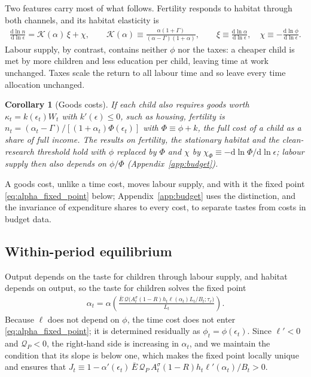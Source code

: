 \documentclass[11pt]{article}
\newtheorem{corollary}{Corollary}
\begin{document}
Two features carry most of what follows. Fertility responds to habitat through both channels, and its
habitat elasticity is
\begin{align}
\frac{\mathrm{d}\ln n}{\mathrm{d}\ln\epsilon}=\mathcal{K}(\alpha)\,\xi+\chi,
\qquad
\mathcal{K}(\alpha)\equiv\frac{\alpha(1+\Gamma)}{(\alpha-\Gamma)(1+\alpha)},
\qquad
\xi\equiv\frac{\mathrm{d}\ln\alpha}{\mathrm{d}\ln\epsilon},\quad
\chi\equiv-\frac{\mathrm{d}\ln\phi}{\mathrm{d}\ln\epsilon}.
\label{eq:S_def}
\end{align}
Labour supply, by contrast, contains neither $\phi$ nor the taxes: a cheaper child is met by more
children and less education per child, leaving time at work unchanged. Taxes scale the return to all
labour time and so leave every time allocation unchanged.

\begin{corollary}[Goods costs]
\label{cor:goods}
If each child also requires goods worth $\kappa_t=k(\epsilon_t)W_t$ with $k'(\epsilon)\le0$, such as
housing, fertility is $n_t=(\alpha_t-\Gamma)/[(1+\alpha_t)\Phi(\epsilon_t)]$ with
$\Phi\equiv\phi+k$, the full cost of a child as a share of full income. The results on fertility, the
stationary habitat and the clean-research threshold hold with $\phi$ replaced by $\Phi$ and $\chi$ by
$\chi_\Phi\equiv-\mathrm{d}\ln\Phi/\mathrm{d}\ln\epsilon$; labour supply then also depends on $\phi/\Phi$
(Appendix~\ref{app:budget}).
\end{corollary}

A goods cost, unlike a time cost, moves labour supply, and with it the fixed point
\eqref{eq:alpha_fixed_point} below; Appendix~\ref{app:budget} uses the distinction,
and the invariance of expenditure shares to every cost, to separate tastes from costs in budget data.

\subsection{Within-period equilibrium}
Output depends on the taste for children through labour supply, and habitat depends on output, so the
taste for children solves the fixed point
\begin{align}
\alpha_t=\alpha\!\left(\frac{\bar E\,\mathcal{Q}\big(A_t^{\sigma}(1-R)h_t\ell(\alpha_t)L_t/B_t;\tau_r\big)}{L_t}\right).
\label{eq:alpha_fixed_point}
\end{align}
Because $\ell$ does not depend on $\phi$, the time cost does not enter \eqref{eq:alpha_fixed_point}; it is
determined residually as $\phi_t=\phi(\epsilon_t)$. Since $\ell'<0$ and $\mathcal{Q}_P<0$, the right-hand
side is increasing in $\alpha_t$, and we maintain the condition that its slope is below one, which makes
the fixed point locally unique and ensures that
$J_t\equiv1-\alpha'(\epsilon_t)\,\bar E\,\mathcal{Q}_P\,A_t^{\sigma}(1-R)h_t\ell'(\alpha_t)/B_t>0$.
\end{document}
